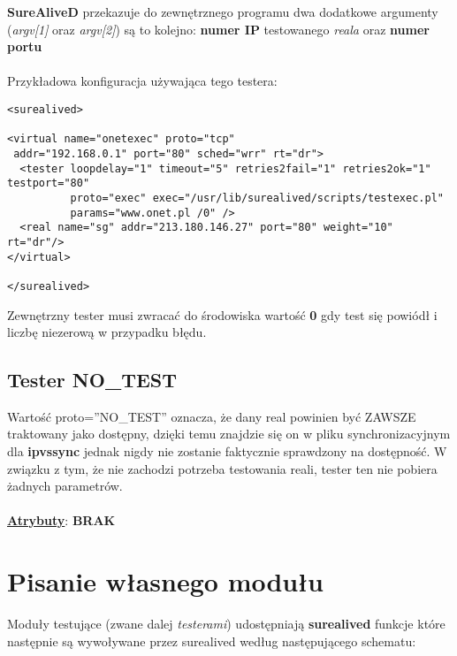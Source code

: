 \documentclass[polish,12pt]{article}
\begin{document}
\textbf{SureAliveD} przekazuje do zewnętrznego programu dwa dodatkowe argumenty 
(\textit{argv[1]} oraz \textit{argv[2]}) są to kolejno: \textbf{numer IP}
testowanego \textit{reala} oraz \textbf{numer portu}\\
\\
Przykładowa konfiguracja używająca tego testera:
{\footnotesize
\begin{verbatim}
<surealived>

<virtual name="onetexec" proto="tcp"
 addr="192.168.0.1" port="80" sched="wrr" rt="dr">
  <tester loopdelay="1" timeout="5" retries2fail="1" retries2ok="1" testport="80"
          proto="exec" exec="/usr/lib/surealived/scripts/testexec.pl"
          params="www.onet.pl /0" />
  <real name="sg" addr="213.180.146.27" port="80" weight="10" rt="dr"/>
</virtual>

</surealived>
\end{verbatim}
}
Zewnętrzny tester musi zwracać do środowiska wartość \textbf{0} gdy test się powiódł i liczbę niezerową
w przypadku błędu.

\subsection{Tester NO\_TEST}
Wartość proto=''NO\_TEST'' oznacza, że dany real powinien być ZAWSZE traktowany jako dostępny,
dzięki temu znajdzie się on w pliku synchronizacyjnym dla \textbf{ipvssync} jednak nigdy
nie zostanie faktycznie sprawdzony na dostępność. W związku z tym, że nie zachodzi potrzeba
testowania reali, tester ten nie pobiera żadnych parametrów.\\
\\\underline{\textbf{Atrybuty}}: \textbf{BRAK}
\newpage

\section{Pisanie własnego modułu}
Moduły testujące (zwane dalej \textit{testerami}) udostępniają \textbf{surealived} funkcje
które następnie są wywoływane przez surealived według następującego schematu:
\begin{center}
\end{center}

\newpage
\end{document}
